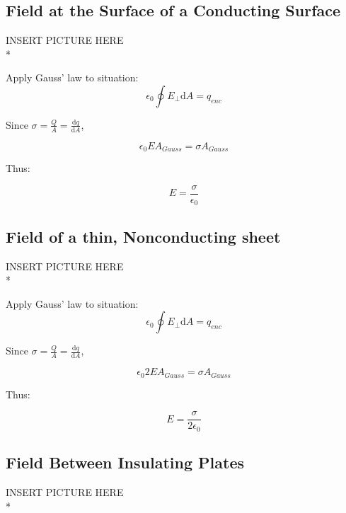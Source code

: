 \documentclass[a4paper,12pt]{article}
\begin{document}
				\subsection{Field at the Surface of a Conducting Surface}
					INSERT PICTURE HERE\\*
					
					Apply Gauss' law to situation:
					\begin{equation*}
							\epsilon_{0} \oint E_{\bot} \mathrm{d}A = q_{enc}
					\end{equation*}

					Since $\sigma= \frac{Q}{A} = \frac{\mathrm{d}q}{\mathrm{d}A}$,

					\begin{equation*}
							\epsilon_{0}E A_{Gauss} = \sigma A_{Gauss}
					\end{equation*}

					Thus:

					\begin{equation*}
							E = \frac{\sigma}{\epsilon_{0}}
					\end{equation*}

				\subsection{Field of a thin, Nonconducting sheet}
					INSERT PICTURE HERE\\*

					Apply Gauss' law to situation:
					\begin{equation*}
							\epsilon_{0} \oint E_{\bot} \mathrm{d}A = q_{enc}
					\end{equation*}

					Since $\sigma= \frac{Q}{A} = \frac{\mathrm{d}q}{\mathrm{d}A}$,

					\begin{equation*}
							\epsilon_{0}2E A_{Gauss} = \sigma A_{Gauss}
					\end{equation*}

					Thus:

					\begin{equation*}
							E = \frac{\sigma}{2\epsilon_{0}}
					\end{equation*}

				\subsection{Field Between Insulating Plates}
					INSERT PICTURE HERE\\*
\end{document}
